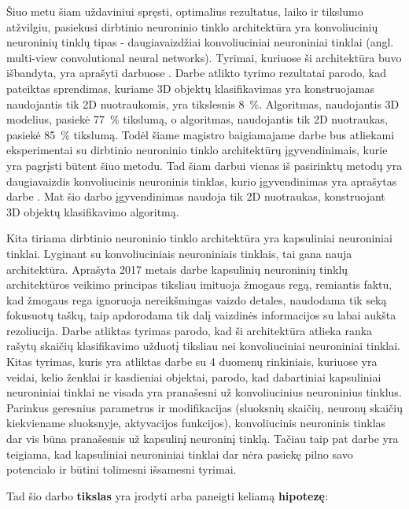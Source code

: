Šiuo metu šiam uždaviniui spręsti, optimalius  rezultatus, laiko ir tikslumo atžvilgiu, pasiekusi dirbtinio neuroninio tinklo architektūra yra konvoliucinių neuroninių tinklų tipas - daugiavaizdžiai konvoliuciniai neuroniniai tinklai (angl. multi-view convolutional neural networks). Tyrimai, kuriuose ši architektūra buvo išbandyta, yra aprašyti darbuose \cite{cnnExp1, cnnExp2}. Darbe \cite{dbnExp} atlikto tyrimo rezultatai parodo, kad pateiktas sprendimas, kuriame 3D objektų klasifikavimas yra konstruojamas naudojantis tik 2D nuotraukomis, yra tikslesnis 8~\%. Algoritmas, naudojantis 3D modelius, pasiekė 77~\% tikslumą, o algoritmas, naudojantis tik 2D nuotraukas, pasiekė 85~\% tikslumą. Todėl šiame magistro baigiamajame darbe bus atliekami eksperimentai su dirbtinio neuroninio tinklo architektūrų įgyvendinimais, kurie yra pagrįsti būtent šiuo metodu. Tad šiam darbui vienas iš pasirinktų metodų yra daugiavaizdis konvoliucinis neuroninis tinklas, kurio įgyvendinimas yra aprašytas darbe \cite{cnnExp1}. Mat šio darbo įgyvendinimas naudoja tik 2D nuotraukas, konstruojant 3D objektų klasifikavimo algoritmą.

Kita tiriama dirbtinio neuroninio tinklo architektūra yra kapsuliniai neuroniniai tinklai. Lyginant su konvoliuciniais neuroniniais tinklais, tai gana nauja architektūra. Aprašyta 2017 metais darbe \cite{capsNet} kapsulinių neuroninių tinklų architektūros veikimo principas tiksliau imituoja žmogaus regą, remiantis faktu, kad žmogaus rega ignoruoja nereikšmingas vaizdo detales, naudodama tik seką fokusuotų taškų, taip apdorodama tik dalį vaizdinės informacijos su labai aukšta rezoliucija. Darbe \cite{capsNet} atliktas tyrimas parodo, kad ši architektūra atlieka ranka rašytų skaičių klasifikavimo užduotį tiksliau nei konvoliuciniai neuroniniai tinklai. Kitas tyrimas, kuris yra atliktas darbe \cite{capsCNN} su 4 duomenų rinkiniais, kuriuose yra veidai, kelio ženklai ir kasdieniai objektai, parodo, kad dabartiniai kapsuliniai neuroniniai tinklai ne visada yra pranašesni už konvoliucinius neuroninius tinklus. Parinkus geresnius parametrus ir modifikacijas (sluoksnių skaičių, neuronų skaičių kiekviename sluoksnyje, aktyvacijos funkcijos), konvoliucinis neuroninis tinklas dar vis būna pranašesnis už kapsulinį neuroninį tinklą. Tačiau taip pat darbe \cite{capsCNN} yra teigiama, kad kapsuliniai neuroniniai tinklai dar nėra pasiekę pilno savo potencialo ir būtini tolimesni išsamesni tyrimai.

Tad šio darbo \textbf{tikslas} yra įrodyti arba paneigti keliamą \textbf{hipotezę}:

